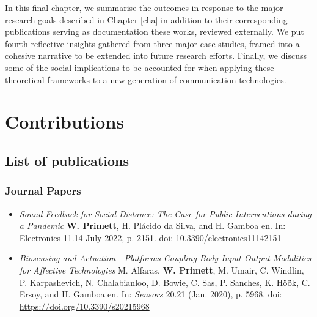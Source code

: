 In this final chapter, we summarise the outcomes in response to the major research goals described in Chapter \ref{cha} in addition to their corresponding publications serving as documentation these works, reviewed externally. We put fourth reflective insights gathered from three major case studies, framed into a cohesive narrative to be extended into future research efforts. Finally, we discuss some of the social implications to be accounted for when applying these theoretical frameworks to a new generation of communication technologies.

\section{Contributions}

\subsection{List of publications}

\subsubsection{Journal Papers}

\begin{itemize}
    \item[] \textit{Sound Feedback for Social Distance: The Case for Public Interventions during a Pandemic}
    \textbf{W. Primett}, H. Plácido da Silva, and H. Gamboa
    en. In: Electronics 11.14 July 2022, p. 2151. doi:
    \url{10.3390/electronics11142151}

    \item[] \textit{Biosensing and Actuation—Platforms Coupling Body Input-Output Modalities for Affective Technologies}
    M. Alfaras, \textbf{W. Primett}, M. Umair, C. Windlin, P. Karpashevich, N. Chalabianloo, D. Bowie, C. Sas, P. Sanches, K. Höök, C. Ersoy, and H. Gamboa
    en. In: \textit{Sensors} 20.21 (Jan. 2020), p. 5968. doi: \url{https://doi.org/10.3390/s20215968}
\end{itemize}


